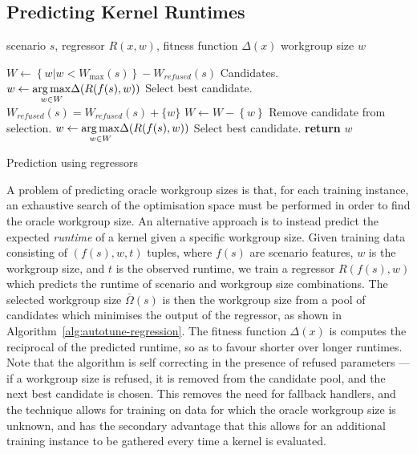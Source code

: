 \documentclass[preprint,nonatbib,10pt]{sigplanconf}
\begin{document}
\subsection{Predicting Kernel Runtimes}

\begin{algorithm}[t]
\begin{algorithmic}[1]
\Require scenario $s$, regressor $R(x, w)$, fitness function $\Delta(x)$
\Ensure workgroup size $w$

\State $W \leftarrow \left\{ w | w < W_{\max}(s) \right\} -
W_{refused}(s)$
\Comment Candidates.
\State $w \leftarrow \underset{w \in W}{\operatorname*{arg\,max}} \Delta(R(f(s), w))$
\Comment Select best candidate.
  \State $W_{refused}(s) = W_{refused}(s) + \{w\}$
  \State $W \leftarrow W - \left\{ w \right\}$
  \Comment Remove candidate from selection.
  \State $w \leftarrow \underset{w \in W}{\operatorname*{arg\,max}} \Delta(R(f(s), w))$
  \Comment Select best candidate.
\EndWhile
\State \textbf{return} $w$
\end{algorithmic}
\caption{Prediction using regressors}
\label{alg:autotune-regression}
\end{algorithm}

A problem of predicting oracle workgroup sizes is that, for each
training instance, an exhaustive search of the optimisation space must
be performed in order to find the oracle workgroup size. An
alternative approach is to instead predict the expected \emph{runtime}
of a kernel given a specific workgroup size. Given training data
consisting of $(f(s),w,t)$ tuples, where $f(s)$ are scenario features,
$w$ is the workgroup size, and $t$ is the observed runtime, we train a
regressor $R(f(s), w)$ which predicts the runtime of scenario and
workgroup size combinations. The selected workgroup size
$\bar{\Omega}(s)$ is then the workgroup size from a pool of candidates
which minimises the output of the regressor, as shown in
Algorithm~\ref{alg:autotune-regression}. The fitness function
$\Delta(x)$ is computes the reciprocal of the predicted runtime, so as
to favour shorter over longer runtimes. Note that the algorithm is
self correcting in the presence of refused parameters --- if a
workgroup size is refused, it is removed from the candidate pool, and
the next best candidate is chosen. This removes the need for fallback
handlers, and the technique allows for training on data for which the
oracle workgroup size is unknown, and has the secondary advantage that
this allows for an additional training instance to be gathered every
time a kernel is evaluated.
\end{document}

